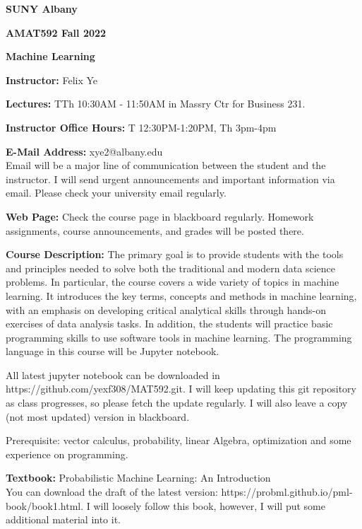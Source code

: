 \documentclass[a4paper,10pt]{article}
\begin{document}
\begin{center}

\textbf{SUNY Albany}

\textbf{AMAT592 Fall 2022}

\textbf{Machine Learning}


\end{center}

\textbf{Instructor:} Felix Ye 

\textbf{Lectures:} TTh 10:30AM - 11:50AM  in Massry Ctr for Business 231.

\textbf{Instructor Office Hours:}  T 12:30PM-1:20PM, Th 3pm-4pm


\textbf{E-Mail Address:} xye2@albany.edu\\
Email will be a major line of communication between the student and the instructor. I will send urgent announcements and important information via email. Please check your university email regularly.

\textbf{Web Page:}
Check the course page in blackboard regularly. Homework assignments, course announcements, and grades will be posted there.


\textbf{Course Description:} The primary goal is to provide students with the tools and principles needed to solve both the traditional and modern data science problems. In particular, the course covers a wide variety of topics in machine learning. It introduces the key terms, concepts and methods in machine learning, with an emphasis on developing critical analytical skills through hands-on exercises of data analysis tasks. In addition, the students will practice basic programming skills to use software tools in machine learning. The programming language in this course will be Jupyter notebook. 

All latest jupyter notebook can be downloaded in https://github.com/yexf308/MAT592.git. I will keep updating this git repository as class progresses, so please fetch the update regularly. I will also leave a copy (not most updated) version in blackboard. 

 Prerequisite: vector calculus, probability, linear Algebra, optimization and some experience on programming. 
 

\textbf{Textbook:} Probabilistic Machine Learning: An Introduction \\
You can download the draft of the latest version: https://probml.github.io/pml-book/book1.html. 
 I will loosely follow this book, however, I will put some additional material into it.
\end{document}
